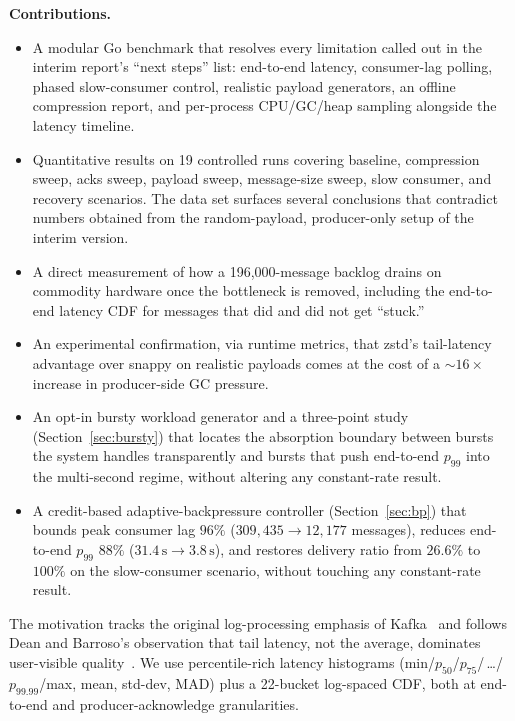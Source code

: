 \documentclass[conference]{IEEEtran}
\begin{document}
\textbf{Contributions.}
\begin{itemize}
\item A modular Go benchmark that resolves every limitation called
  out in the interim report's ``next steps'' list: end-to-end latency,
  consumer-lag polling, phased slow-consumer control, realistic
  payload generators, an offline compression report, and per-process
  CPU/GC/heap sampling alongside the latency timeline.
\item Quantitative results on 19 controlled runs covering baseline,
  compression sweep, acks sweep, payload sweep, message-size sweep,
  slow consumer, and recovery scenarios. The data set surfaces several
  conclusions that contradict numbers obtained from the
  random-payload, producer-only setup of the interim version.
\item A direct measurement of how a 196{,}000-message backlog drains
  on commodity hardware once the bottleneck is removed, including the
  end-to-end latency CDF for messages that did and did not get
  ``stuck.''
\item An experimental confirmation, via runtime metrics, that
  zstd's tail-latency advantage over snappy on realistic payloads
  comes at the cost of a $\sim$$16\times$ increase in producer-side GC
  pressure.
\item An opt-in bursty workload generator and a three-point study
  (Section~\ref{sec:bursty}) that locates the absorption boundary
  between bursts the system handles transparently and bursts that
  push end-to-end $p_{99}$ into the multi-second regime, without
  altering any constant-rate result.
\item A credit-based adaptive-backpressure controller
  (Section~\ref{sec:bp}) that bounds peak consumer lag $96\%$
  ($309{,}435 \to 12{,}177$ messages), reduces end-to-end $p_{99}$
  $88\%$ ($31.4\,\text{s} \to 3.8\,\text{s}$), and restores delivery
  ratio from $26.6\%$ to $100\%$ on the slow-consumer scenario,
  without touching any constant-rate result.
\end{itemize}

The motivation tracks the original log-processing emphasis of
Kafka~\cite{kreps11} and follows Dean and Barroso's observation that
tail latency, not the average, dominates user-visible
quality~\cite{tail}. We use percentile-rich latency histograms
(min/$p_{50}$/$p_{75}$/\,\ldots/$p_{99.99}$/max, mean, std-dev, MAD)
plus a 22-bucket log-spaced CDF, both at end-to-end and
producer-acknowledge granularities.
\end{document}
